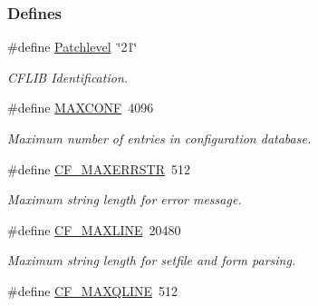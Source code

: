 \subsubsection*{Defines}
\begin{DoxyCompactItemize}
\item 
\hypertarget{group__cflib__core_ga0beb5d41f2b506f1c969c56731bb9490}{\#define \hyperlink{group__cflib__core_ga0beb5d41f2b506f1c969c56731bb9490}{Patchlevel}~\char`\"{}21\char`\"{}}\label{group__cflib__core_ga0beb5d41f2b506f1c969c56731bb9490}

\begin{DoxyCompactList}\small\item\em C\-F\-L\-I\-B Identification. \end{DoxyCompactList}\item 
\hypertarget{group__cflib__core_ga1662beae23df229341c28d286379e2ad}{\#define \hyperlink{group__cflib__core_ga1662beae23df229341c28d286379e2ad}{M\-A\-X\-C\-O\-N\-F}~4096}\label{group__cflib__core_ga1662beae23df229341c28d286379e2ad}

\begin{DoxyCompactList}\small\item\em Maximum number of entries in configuration database. \end{DoxyCompactList}\item 
\hypertarget{group__cflib__core_gaf78e4b950c9aa49b752e4460342ea3bf}{\#define \hyperlink{group__cflib__core_gaf78e4b950c9aa49b752e4460342ea3bf}{C\-F\-\_\-\-M\-A\-X\-E\-R\-R\-S\-T\-R}~512}\label{group__cflib__core_gaf78e4b950c9aa49b752e4460342ea3bf}

\begin{DoxyCompactList}\small\item\em Maximum string length for error message. \end{DoxyCompactList}\item 
\hypertarget{group__cflib__core_gac7ffaf92294adc15284233965f54c03e}{\#define \hyperlink{group__cflib__core_gac7ffaf92294adc15284233965f54c03e}{C\-F\-\_\-\-M\-A\-X\-L\-I\-N\-E}~20480}\label{group__cflib__core_gac7ffaf92294adc15284233965f54c03e}

\begin{DoxyCompactList}\small\item\em Maximum string length for setfile and form parsing. \end{DoxyCompactList}\item 
\hypertarget{group__cflib__core_gac91ed2022fe6617330f369b4e20b875b}{\#define \hyperlink{group__cflib__core_gac91ed2022fe6617330f369b4e20b875b}{C\-F\-\_\-\-M\-A\-X\-Q\-L\-I\-N\-E}~512}\label{group__cflib__core_gac91ed2022fe6617330f369b4e20b875b}


\end{DoxyCompactItemize}
